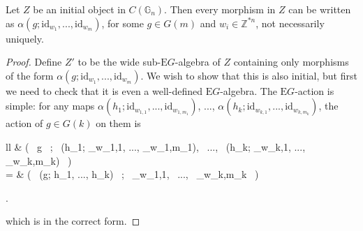 \documentclass{amsart} %
\newenvironment{eq*}{\begin{equation*}}{\end{equation*}}
\begin{document}
\begin{prop}\label{allmapsaction} Let $Z$ be an initial object in $C(\mathbb{G}_n)$. Then every morphism in $Z$ can be written as $\alpha(g; \mathrm{id}_{w_1}, ..., \mathrm{id}_{w_m})$, for some $g \in G(m)$ and $w_i \in \mathbb{Z}^{*n}$, not necessarily uniquely. 
\end{prop}
\begin{proof} Define $Z'$ to be the wide sub-$\mathrm{E}G$-algebra of $Z$ containing only morphisms of the form $\alpha(g; \mathrm{id}_{w_1}, ..., \mathrm{id}_{w_m})$. We wish to show that this is also initial, but first we need to check that it is even a well-defined $\mathrm{E}G$-algebra. The $\mathrm{E}G$-action is simple: for any maps $\alpha(h_1; \mathrm{id}_{w_{1,1}}, ..., \mathrm{id}_{w_{1,m_1}})$, ..., $\alpha(h_k; \mathrm{id}_{w_{k,1}}, ..., \mathrm{id}_{w_{k,m_k}})$, the action of $g \in G(k)$ on them is
\begin{eq*}\begin{array}{ll}
		& \alpha \big( \, g \, ; \,  \alpha(h_1; _{w_{1,1}}, ..., _{w_{1,m_1}}), \, ..., \, \alpha(h_k; _{w_{k,1}}, ..., _{w_{k,m_k}}) \, \big) \\
		= & \alpha \big( \, \mu(g; h_1, ..., h_k) \, ; \, _{w_{1,1}}, \, ..., \, _{w_{k,m_k}} \, \big)
		\end{array}.
\end{eq*}
which is in the correct form.


\end{proof}
\end{document}
